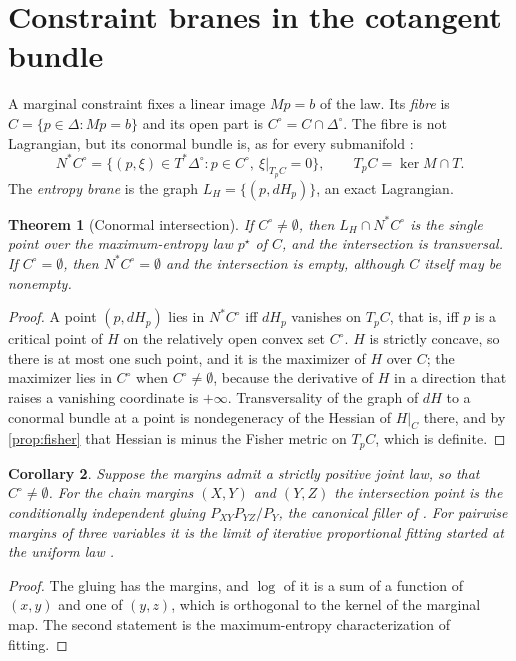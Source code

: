\documentclass[11pt]{article}
\newtheorem{theorem}{Theorem}[section]
\newtheorem{corollary}[theorem]{Corollary}
\theoremstyle{definition}
\theoremstyle{remark}
\begin{document}
\section{Constraint branes in the cotangent bundle}\label{sec:conormal}

A marginal constraint fixes a linear image $Mp=b$ of the law. Its \emph{fibre} is $C=\{p\in\Delta:Mp=b\}$ and its open part is
$C^\circ=C\cap\Delta^\circ$. The fibre is not Lagrangian, but its conormal bundle is, as for every submanifold
\cite{McDuffSalamon2017}:
\[
N^*C^\circ=\{(p,\xi)\in T^*\Delta^\circ:p\in C^\circ,\ \xi\vert_{T_pC}=0\},\qquad T_pC=\ker M\cap T.
\]
The \emph{entropy brane} is the graph $L_H=\{(p,dH_p)\}$, an exact Lagrangian.

\begin{theorem}[Conormal intersection]\label{thm:conormal}
If $C^\circ\neq\emptyset$, then $L_H\cap N^*C^\circ$ is the single point over the maximum-entropy law $p^\star$ of $C$, and the
intersection is transversal. If $C^\circ=\emptyset$, then $N^*C^\circ=\emptyset$ and the intersection is empty, although $C$ itself may
be nonempty.
\end{theorem}
\begin{proof}
A point $(p,dH_p)$ lies in $N^*C^\circ$ iff $dH_p$ vanishes on $T_pC$, that is, iff $p$ is a critical point of $H$ on the
relatively open convex set $C^\circ$. $H$ is strictly concave, so there is at most one such point, and it is the maximizer of $H$
over $C$; the maximizer lies in $C^\circ$ when $C^\circ\ne\emptyset$, because the derivative of $H$ in a direction that raises a
vanishing coordinate is $+\infty$. Transversality of the graph of $dH$ to a conormal bundle at a point is nondegeneracy of the
Hessian of $H\vert_C$ there, and by \cref{prop:fisher} that Hessian is minus the Fisher metric on $T_pC$, which is definite.
\end{proof}

\begin{corollary}\label{cor:filler}
Suppose the margins admit a strictly positive joint law, so that $C^\circ\ne\emptyset$. For the chain margins $(X,Y)$ and $(Y,Z)$ the intersection point is the conditionally independent gluing
$P_{XY}P_{YZ}/P_Y$, the canonical filler of \cite[Thm.~4.2]{Conditionals}. For pairwise margins of three variables it is the
limit of iterative proportional fitting started at the uniform law \cite{Csiszar1975}.
\end{corollary}
\begin{proof}
The gluing has the margins, and $\log$ of it is a sum of a function of $(x,y)$ and one of $(y,z)$, which is orthogonal to the
kernel of the marginal map. The second statement is the maximum-entropy characterization of fitting.
\end{proof}
\end{document}
